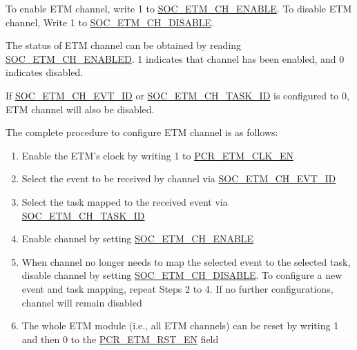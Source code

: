 \documentclass[main\_\_EN.tex]{subfiles}
\begin{document}
To enable ETM channel, write 1 to \hyperref[fielddesc:SOCETMCHENABLE0]{SOC\_ETM\_CH\_ENABLE}. To disable ETM channel, Write 1 to \hyperref[fielddesc:SOCETMCHDISABLE0]{SOC\_ETM\_CH\_DISABLE}.

The status of ETM channel can be obtained by reading \hyperref[fielddesc:SOCETMCHENABLED0]{SOC\_ETM\_CH\_ENABLED}. 1 indicates that channel has been enabled, and 0 indicates disabled.

If \hyperref[fielddesc:SOCETMCH0EVTID]{SOC\_ETM\_CH\_EVT\_ID} or  \hyperref[fielddesc:SOCETMCH0TASKID]{SOC\_ETM\_CH\_TASK\_ID} is configured to 0, ETM channel will also be disabled.

The complete procedure to configure ETM channel is as follows:
\begin{enumerate}
    \item Enable the ETM's clock by writing 1 to \hyperref[fielddesc:PCRETMCLKEN]{PCR\_ETM\_CLK\_EN}
    \item Select the event to be received by channel via \hyperref[fielddesc:SOCETMCH0EVTID]{SOC\_ETM\_CH\_EVT\_ID}
    \item Select the task mapped to the received event via  \hyperref[fielddesc:SOCETMCH0TASKID]{SOC\_ETM\_CH\_TASK\_ID}
    \item Enable channel by setting  \hyperref[fielddesc:SOCETMCHENABLE0]{SOC\_ETM\_CH\_ENABLE}
    \item When channel no longer needs to map the selected event to the selected task, disable channel by setting \hyperref[fielddesc:SOCETMCHDISABLE0]{SOC\_ETM\_CH\_DISABLE}. To configure a new event and task mapping, repeat Steps 2 to 4. If no further configurations, channel will remain disabled
    \item The whole ETM module (i.e., all ETM channels) can be reset by writing 1 and then 0 to the \hyperref[fielddesc:PCRETMRSTEN]{PCR\_ETM\_RST\_EN} field
\end{enumerate}



\end{document}
